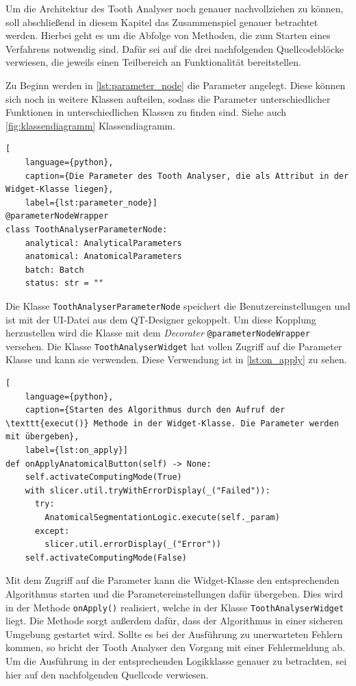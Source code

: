 Um die Architektur des Tooth Analyser noch genauer nachvollziehen zu können, soll
abschließend in diesem Kapitel das Zusammenspiel genauer betrachtet werden.
Hierbei geht es um die Abfolge von Methoden, die zum Starten eines Verfahrens notwendig
sind. Dafür sei auf die drei nachfolgenden Quellcodeblöcke verwiesen, die jeweils
einen Teilbereich an Funktionalität bereitstellen.

Zu Beginn werden in \ref{lst:parameter_node} die Parameter angelegt. Diese
können sich noch in weitere Klassen aufteilen, sodass die Parameter unterschiedlicher
Funktionen in unterschiedlichen Klassen zu finden sind. Siehe auch
\ref{fig:klassendiagramm} Klassendiagramm.

\begin{lstlisting}[
    language={python},
    caption={Die Parameter des Tooth Analyser, die als Attribut in der Widget-Klasse liegen},
    label={lst:parameter_node}]
@parameterNodeWrapper
class ToothAnalyserParameterNode:
    analytical: AnalyticalParameters
    anatomical: AnatomicalParameters
    batch: Batch
    status: str = ""
\end{lstlisting}

Die Klasse \texttt{ToothAnalyserParameterNode} speichert die
Benutzereinstellungen und ist mit der UI-Datei aus dem QT-Designer gekoppelt. Um
diese Kopplung herzustellen wird die Klasse mit dem \textit{Decorater} \texttt{@parameterNodeWrapper}
versehen. Die Klasse \texttt{ToothAnalyserWidget} hat vollen Zugriff auf die Parameter
Klasse und kann sie verwenden. Diese Verwendung ist in \ref{lst:on_apply} zu
sehen.

\begin{lstlisting}[
    language={python},
    caption={Starten des Algorithmus durch den Aufruf der \texttt{execut()} Methode in der Widget-Klasse. Die Parameter werden mit übergeben},
    label={lst:on_apply}]
def onApplyAnatomicalButton(self) -> None:
    self.activateComputingMode(True)
    with slicer.util.tryWithErrorDisplay(_("Failed")):
	  try:
	    AnatomicalSegmentationLogic.execute(self._param)
	  except:
	    slicer.util.errorDisplay(_("Error"))
    self.activateComputingMode(False)
\end{lstlisting}

Mit dem Zugriff auf die Parameter kann die Widget-Klasse den entsprechenden Algorithmus
starten und die Parametereinstellungen dafür übergeben. Dies wird in der Methode
\texttt{onApply()} realisiert, welche in der Klasse \texttt{ToothAnalyserWidget}
liegt. Die Methode sorgt außerdem dafür, dass der Algorithmus in einer sicheren Umgebung
gestartet wird. Sollte es bei der Ausführung zu unerwarteten Fehlern kommen, so bricht
der Tooth Analyser den Vorgang mit einer Fehlermeldung ab. Um die Ausführung in
der entsprechenden Logikklasse genauer zu betrachten, sei hier auf den nachfolgenden
Quellcode verwiesen.

